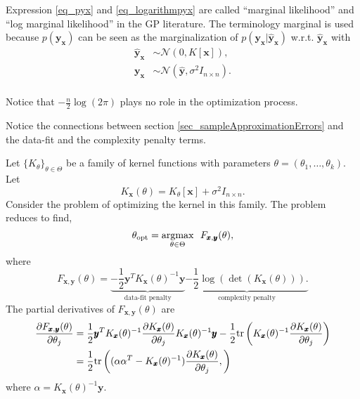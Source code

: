 \begin{remark} \label{remark_marginalLikelihoodGP}
Expression \ref{eq_pyx} and \ref{eq_logarithmpyx} are called ``marginal likelihood'' and ``log marginal likelihood'' in the GP literature.
The terminology marginal is used because $p(\pmb{y}_{\pmb{x}})$ can be seen as the marginalization of $p(\pmb{y}_{\pmb{x}} | \pmb{\hat{y}}_{\pmb{x}})$ w.r.t. $\pmb{\hat{y}}_{\pmb{x}}$ with
$$
 \begin{aligned}
  \pmb{\hat{y}}_{\pmb{x}} &\sim \mathcal{N}(0,K[\pmb{x}]), \\
  \pmb{y}_{\pmb{x}} &\sim \mathcal{N}(\pmb{\hat{y}},\sigma^2 I_{n \times n}).\\
 \end{aligned}
$$
\end{remark}

\begin{remark}
  Notice that $-\frac{n}{2}\log(2\pi)$ plays no role in the optimization process.
\end{remark}

\begin{remark} \label{remark_GPandErrorsConnections}
  Notice the connections between section \ref{sec_sampleApproximationErrors} and the data-fit and the complexity penalty terms.%
\end{remark}

Let $\{K_{\theta}\}_{\theta\in\Theta}$ be a family of kernel functions with parameters $\theta = (\theta_1, \dots, \theta_k)$.%
Let
$$
  K_{\pmb{x}}(\theta) = 
           K_{\theta}[\pmb{x}] + \sigma^2 I_{n \times n}.
$$
Consider the problem of optimizing the kernel in this family.
The problem reduces to find,
$$
  \theta_{\textup{opt}} = \underset{\theta\in\Theta}{\textup{argmax}} \ \ F_{\pmb{x},\pmb{y}}(\theta),
$$
where
$$
  F_{\pmb{x},\pmb{y}}(\theta) =
           \underbrace{ 
           -\frac{1}{2}
           \pmb{y}^T
           K_{\pmb{x}}(\theta)^{-1}
           \pmb{y}
           }_{\text{data-fit penalty}}
           \underbrace{ 
           -\frac{1}{2} 
           \log(\det(K_{\pmb{x}}(\theta))).%
           }_{\text{complexity penalty}}
$$
The partial derivatives of $F_{\pmb{x},\pmb{y}}(\theta)$ are
$$
 \begin{aligned}
  \frac{\partial F_{\pmb{x},\pmb{y}}(\theta)}{\partial\theta_j} &=
    \frac{1}{2}
    \pmb{y}^T
    K_{\pmb{x}}(\theta)^{-1}
    \frac{\partial K_{\pmb{x}}(\theta)}{\partial\theta_j}
    K_{\pmb{x}}(\theta)^{-1}
    \pmb{y}
    -\frac{1}{2}
    \textup{tr}\left(
      K_{\pmb{x}}(\theta)^{-1}
      \frac{\partial K_{\pmb{x}}(\theta)}{\partial\theta_j}
    \right) \\
    &= \frac{1}{2}\textup{tr}\left(
    (\alpha\alpha^T-K_{\pmb{x}}(\theta)^{-1})
    \frac{\partial K_{\pmb{x}}(\theta)}{\partial\theta_j},
    \right) \\ 
 \end{aligned}
$$
where $\alpha = K_{\pmb{x}}(\theta)^{-1}\pmb{y}$.

